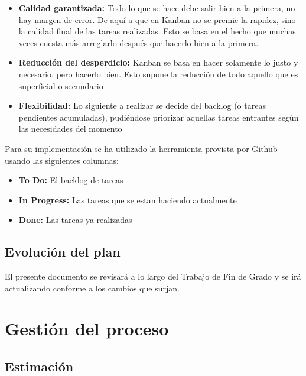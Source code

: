 \documentclass[openright,twoside,10pt]{book}
\begin{document}
    \begin{itemize}
    \item
      \textbf{Calidad garantizada:} Todo lo que se hace debe salir bien a la
      primera, no hay margen de error. De aquí a que en Kanban no se premie
      la rapidez, sino la calidad final de las tareas realizadas. Esto se
      basa en el hecho que muchas veces cuesta más arreglarlo después que
      hacerlo bien a la primera.
    \item
      \textbf{Reducción del desperdicio:} Kanban se basa en hacer solamente
      lo justo y necesario, pero hacerlo bien. Esto supone la reducción de
      todo aquello que es superficial o secundario
    \item
      \textbf{Flexibilidad:} Lo siguiente a realizar se decide del backlog
      (o tareas pendientes acumuladas), pudiéndose priorizar aquellas tareas
      entrantes según las necesidades del momento
    \end{itemize}
    
    Para su implementación se ha utilizado la herramienta provista por
    Github usando las siguientes columnas:
    
    \begin{itemize}
    \item
      \textbf{To Do:} El backlog de tareas
    \item
      \textbf{In Progress:} Las tareas que se estan haciendo actualmente
    \item
      \textbf{Done:} Las tareas ya realizadas
    \end{itemize}
    
    \subsection{Evolución del plan}\label{evoluciuxf3n-del-plan}
    
    El presente documento se revisará a lo largo del Trabajo de Fin de Grado
    y se irá actualizando conforme a los cambios que surjan.
    
    \section{Gestión del proceso}\label{gestiuxf3n-del-proceso}
    
    \subsection{Estimación}\label{estimaciuxf3n}
    
\end{document}
